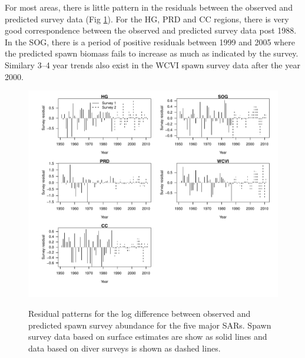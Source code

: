 For most areas, there is little pattern in the residuals between the observed and predicted survey data (Fig \ref{PartII:Results:fig2}).  For the HG, PRD and CC regions, there is very good correspondence between the observed and predicted survey data post 1988.  In the SOG, there is a period of positive residuals between 1999 and 2005 where the predicted spawn biomass fails to increase as much as indicated by the survey.  Similary 3--4 year trends also exist in the WCVI spawn survey data after the year 2000.

\begin{figure}[!tbp]
	\includegraphics[width=\textwidth]{../FIGS/qPriorFigs/iscam_fig_surveyresid.pdf}\\
	\caption{Residual patterns for the log difference between observed and predicted spawn survey abundance for the five major SARs. Spawn survey data based on surface estimates are show as solid lines and data based on diver surveys is shown as dashed lines.}\label{PartII:Results:fig2}
\end{figure}

